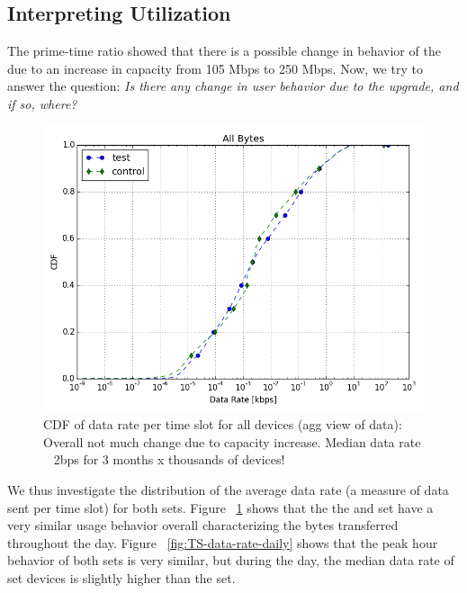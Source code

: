\subsection{Interpreting Utilization}
\label{subsec:utilization}

The prime-time ratio showed that there is a possible change in behavior of the \test due to an increase in capacity from 105 Mbps to 250 Mbps. Now, we try to answer the question: \emph{Is there any change in user behavior due to the upgrade, and if so, where?}

\begin{figure}[ht!]
\centering
\includegraphics[width=0.90\linewidth]{figures/cdf-all-bytes.png}
  \caption{CDF of data rate per time slot for all devices (agg view of data): Overall not much change due to capacity increase. Median data rate ~ 2bps for 3 months x thousands of devices!}
  \label{fig:CDF-data-rate-all}
\end{figure}

We thus investigate the distribution of the average data rate (a measure of data sent per time slot) for both sets. Figure ~\ref{fig:CDF-data-rate-all} shows that the the \control and \test set have a very similar usage behavior overall characterizing the bytes transferred throughout the day. Figure ~\ref{fig:TS-data-rate-daily} shows that the peak hour behavior of both sets is very similar, but during the day, the median data rate of \test set devices is slightly higher  than the \control set.

